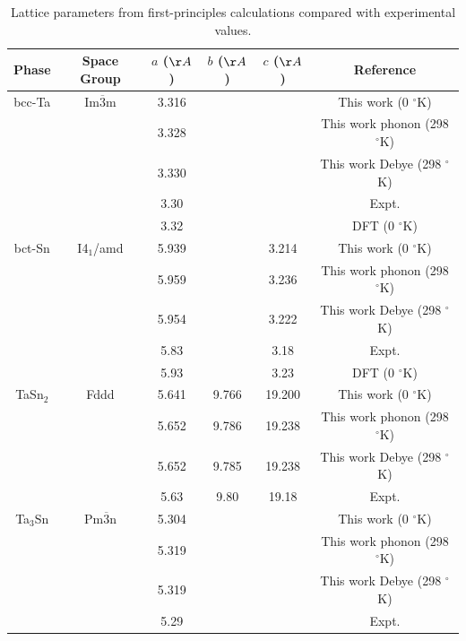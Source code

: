 \newpage
\begin{table}[H]
	\caption{Lattice parameters from first-principles calculations compared with experimental values.}
	\centering
	\begin{tabular}{ c c c c c c }
		\hline
		Phase & Space Group & $a$ ($\AA$) & $b$ ($\AA$)  & $c$ ($\AA$) & Reference\\
		\hline
		bcc-Ta & Im$\overline{3}$m & 3.316 & & &This work (0 $^\circ$K)\\
		            &                             & 3.328 & & & This work phonon (298 $^\circ$K)\\
		            &                             & 3.330 & & & This work Debye (298 $^\circ$K)\\
		            &                             & 3.30   & & & Expt. \cite{Predmore1970}\\
		            &                             & 3.32   & & & DFT (0 $^\circ$K) \cite{Shang2010b}\\
		bct-Sn & I4$_1$/amd & 5.939 & & 3.214 & This work (0 $^\circ$K)\\
		            &                   & 5.959 & & 3.236 & This work phonon (298 $^\circ$K)\\
		            &                   & 5.954 & & 3.222 & This work Debye (298 $^\circ$K)\\
		            &                   & 5.83   & & 3.18 & Expt. \cite{Allen1991}\\
		            &                   & 5.93   & & 3.23 & DFT (0 $^\circ$K) \cite{Arroyave2006a}\\
         TaSn$_2$ & Fddd & 5.641 & 9.766 & 19.200 & This work (0 $^\circ$K)\\
              &          & 5.652 & 9.786 & 19.238 & This work phonon (298 $^\circ$K)\\
              &          & 5.652 & 9.785 & 19.238 & This work Debye (298 $^\circ$K)\\
                         &          & 5.63 & 9.80 & 19.18 & Expt. \cite{Calvert1991}\\
          Ta$_3$Sn & Pm$\overline{3}$n & 5.304 & & &This work (0 $^\circ$K)\\
                          &                   & 5.319 & & & This  work phonon (298 $^\circ$K)\\
                          &                   & 5.319 & & & This work Debye (298 $^\circ$K)\\
                          &                   & 5.29 & & & Expt. \cite{Courtney1965}\\
		\hline
	\end{tabular}
	\label{Ch4-table:TaSnlattice}
\end{table}
\clearpage

